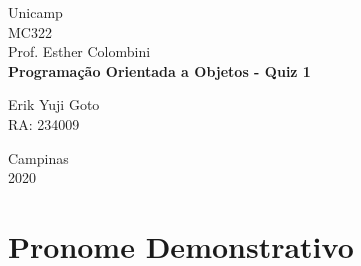 \documentclass[a4paper, 12pt]{article}
\begin{document}
\begin{titlepage} %
	\begin{center} %
		{\large Unicamp}\\[0.2cm] %
		{\large MC322}\\[0.2cm] %
		{\large Prof. Esther Colombini}\\[3.2cm]
		{\bf \huge Programação Orientada a Objetos - Quiz 1}\\[5.1cm] %
	\end{center} %
	{\large Erik Yuji Goto}\\[0.5cm] %
	{\large RA: 234009}\\[10cm]
	\begin{center}
		{\large Campinas}\\[0.2cm]
		{\large 2020}
	\end{center}
\end{titlepage} %

\newpage
\section{Pronome Demonstrativo}
\end{document}
